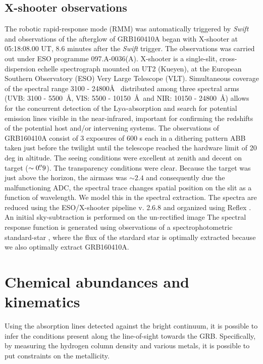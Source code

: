\documentclass[a4paper,fleqn,usenatbib]{mnras}
\newcommand{\lya}{Ly$\alpha$}
\begin{document}
\subsection{X-shooter observations}

 The robotic rapid-response mode (RMM) was automatically triggered by
 \textit{Swift} and observations of the afterglow of GRB160410A began with
 X-shooter \citep{Vernet2011} at 05:18:08.00 UT, 8.6 minutes after the
 \textit{Swift} trigger. The observations was carried out under ESO programme
 097.A-0036(A). X-shooter is a single-slit, cross-dispersion echelle
 spectrograph mounted on UT2 (Kueyen), at the European Southern Observatory
 (ESO) Very Large Telescope (VLT). Simultaneous coverage of the spectral range
 3100 - 24800\AA~ distributed among three spectral arms (UVB: 3100 - 5500~\AA,
 VIS: 5500 - 10150~\AA~and NIR: 10150 - 24800~\AA) allows for the concurrent
 detection of the \lya-absorption and search for potential emission lines
 visible in the near-infrared, important for confirming the redshifts of the
 potential host and/or intervening systems. The observations of GRB160410A
 consist of 3 exposures of 600 s each in a dithering pattern ABB taken just
 before the twilight until the telescope reached the hardware limit of 20 deg in
 altitude. The seeing conditions were excellent at zenith and decent on target
 ($\sim0\hbox{$.\!\!^{\prime\prime}$}9$). The transparency conditions were clear. Because the target
 was just above the horizon, the airmass was $\sim2.4$ and consequently due the
 malfunctioning ADC, the spectral trace changes spatial position on the slit as
 a function of wavelength. We model this in the spectral extraction. The spectra
 are reduced using the ESO/X-shooter pipeline v. 2.6.8 \citep{Modigliani2010}
 and organized using Reflex \citep{Freudling2013}. An initial sky-subtraction is
 performed on the un-rectified image The spectral response function is generated
 using observations of a spectrophotometric standard-star \citep{Vernet2010,
 	Hamuy1994}, where the flux of the stardard star is optimally extracted because
 we also optimally extract GRB160410A.

\section{Chemical abundances and kinematics}

Using the absorption lines detected against the bright continuum, it is possible
to infer the conditions present along the line-of-sight towards the GRB.
Specifically, by measuring the hydrogen column density and various metals, it is
possible to put constraints on the metallicity.
\end{document}
